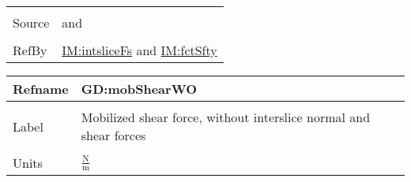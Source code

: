 \documentclass[12pt]{article}
\begin{document}
\begin{minipage}{\textwidth}
\begin{tabular}{>{\raggedright}p{}>{\raggedright\arraybackslash}p{}}
\\ \midrule \\
Source & \cite{chen2005} and \cite{karchewski2012}
         
\\ \midrule \\
RefBy & \hyperref[IM:intsliceFs]{IM:intsliceFs} and \hyperref[IM:fctSfty]{IM:fctSfty}
        
\\ \bottomrule
\end{tabular}
\end{minipage}

\vspace{\baselineskip}
\noindent
\begin{minipage}{\textwidth}
\begin{tabular}{>{\raggedright}p{}>{\raggedright\arraybackslash}p{}}
\toprule \textbf{Refname} & \textbf{GD:mobShearWO}
\label{GD:mobShearWO}
\\ \midrule \\
Label & Mobilized shear force, without interslice normal and shear forces
        
\\ \midrule \\
Units & $\frac{\text{N}}{\text{m}}$
        

\end{tabular}
\end{minipage}
\end{document}

